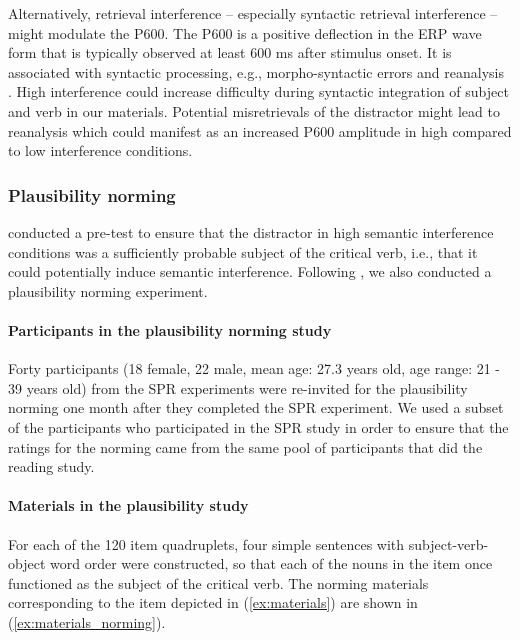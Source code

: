 \documentclass[review,preprint,12pt,authoryear,floatsintext]{elsarticle}
\begin{document}
{Alternatively, retrieval interference -- especially syntactic retrieval interference -- might modulate the P600. The P600 is a positive deflection in the ERP wave form that is typically observed at least 600 ms after stimulus onset. It is associated with syntactic processing, e.g., morpho-syntactic errors and reanalysis \citep[see, e.g.,][]{osterhout&holcomb_1992, kaan_etal_2000_P600}. High interference could increase difficulty during syntactic integration of subject and verb in our materials. Potential misretrievals of the distractor might lead to reanalysis which could manifest as an increased P600 amplitude in high compared to low interference conditions.} \label{why_n400}




\subsubsection*{Plausibility norming} \label{plausib_normin_orig}
\citeauthor{vandyke07} conducted a pre-test to ensure that the distractor in high semantic interference conditions was a sufficiently probable subject of the critical verb, i.e., that it could potentially induce semantic interference. Following \citeauthor{vandyke07}, we also conducted a plausibility norming experiment.

\paragraph{Participants in the plausibility norming study}
Forty participants (18 female, 22 male, mean age: 27.3 years old, age range: 21 - 39 years old) from the SPR experiments were re-invited for the plausibility norming one month after they completed the SPR experiment. We used a subset of the participants who participated in the SPR study in order to ensure that the ratings for the norming came from the same pool of participants that did the reading study.

\paragraph{Materials in the plausibility study}
For each of the 120 item quadruplets, four simple sentences with subject-verb-object word order were constructed, so that each of the nouns in the item once functioned as the subject of the critical verb. The norming materials corresponding to the item depicted in (\ref{ex:materials}) are shown in (\ref{ex:materials_norming}).
\end{document}
